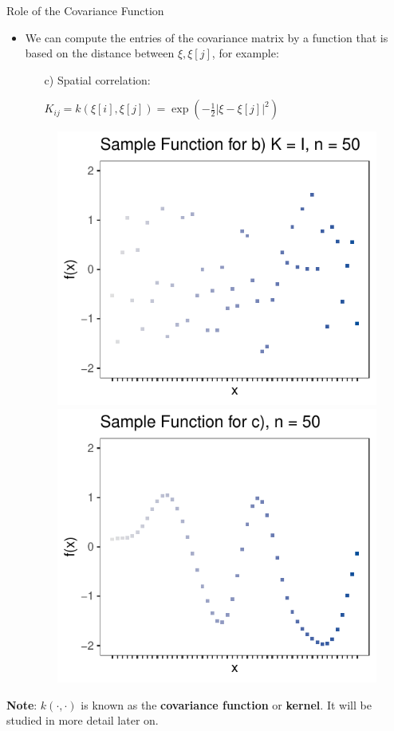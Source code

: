 \documentclass[11pt,compress,t,notes=noshow, xcolor=table]{beamer}
\begin{document}
\begin{vbframe}{Role of the Covariance Function}
\begin{itemize}
  \framebreak

  \item We can compute the entries of the covariance matrix by a function that is based on the distance between $\xi, \xi[j]$, for example:

  \vspace*{0.2cm}
  \begin{enumerate}
    \item[c)] Spatial correlation: \begin{footnotesize}$K_{ij} = k(\xi[i], \xi[j]) = \exp\left(-\frac{1}{2}\left|\xi - \xi[j]\right|^2\right)$\end{footnotesize}
  \end{enumerate}

\begin{figure}
  \includegraphics[width=0.45\linewidth]{figure/discrete/example_extreme_50_4.pdf}  \includegraphics[width=0.45\linewidth]{figure/discrete/example_extreme_50_3.pdf}
\end{figure}

\end{itemize}

\begin{footnotesize}
\textbf{Note}: $k(\cdot,\cdot)$ is known as the \textbf{covariance function} or \textbf{kernel}. It will be studied in more detail later on.
\end{footnotesize}

\end{vbframe}

\endlecture
\end{document}
